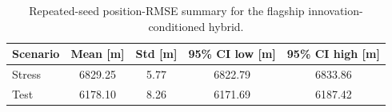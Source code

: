 \begin{table}[t]
  \centering
  \caption{Repeated-seed position-RMSE summary for the flagship innovation-conditioned hybrid.}
  \label{tab:seed_sweep}
  \begin{tabular}{lcccc}
    \toprule
    Scenario & Mean [m] & Std [m] & 95\% CI low [m] & 95\% CI high [m] \\
    \midrule
    Stress & 6829.25 & 5.77 & 6822.79 & 6833.86 \\
    Test & 6178.10 & 8.26 & 6171.69 & 6187.42 \\
    \bottomrule
  \end{tabular}
\end{table}